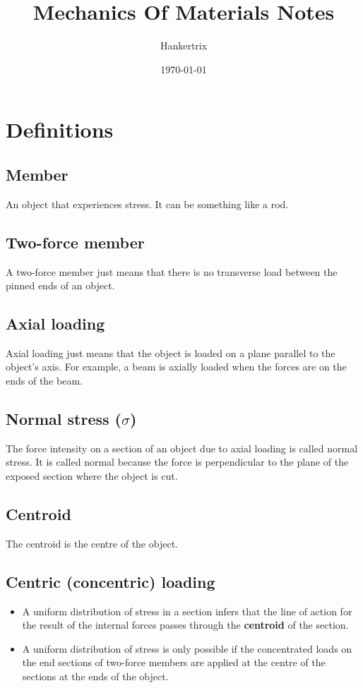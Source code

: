\documentclass[11pt]{article}
\author{Hankertrix}
\date{\today}
\title{Mechanics Of Materials Notes}
\begin{document}
\maketitle
\setcounter{tocdepth}{2}
\tableofcontents \clearpage\section{Definitions}
\label{sec:orgb8567b3}

\subsection{Member}
\label{sec:orgc4c1d21}
An object that experiences stress. It can be something like a rod.
\subsection{Two-force member}
\label{sec:org0a29db9}
A two-force member just means that there is no transverse load between the pinned ends of an object.
\subsection{Axial loading}
\label{sec:orgf5e2e96}
Axial loading just means that the object is loaded on a plane parallel to the object's axis. For example, a beam is axially loaded when the forces are on the ends of the beam.
\subsection{Normal stress (\(\sigma\))}
\label{sec:orgf4726d0}
The force intensity on a section of an object due to axial loading is called normal stress. It is called normal because the force is perpendicular to the plane of the exposed section where the object is cut.
\subsection{Centroid}
\label{sec:orgdce5554}
The centroid is the centre of the object.
\subsection{Centric (concentric) loading}
\label{sec:org92c2f5b}
\begin{itemize}
\item A uniform distribution of stress in a section infers that the line of action for the result of the internal forces passes through the \textbf{centroid} of the section.
\item A uniform distribution of stress is only possible if the concentrated loads on the end sections of two-force members are applied at the centre of the sections at the ends of the object.
\end{itemize}
\end{document}

